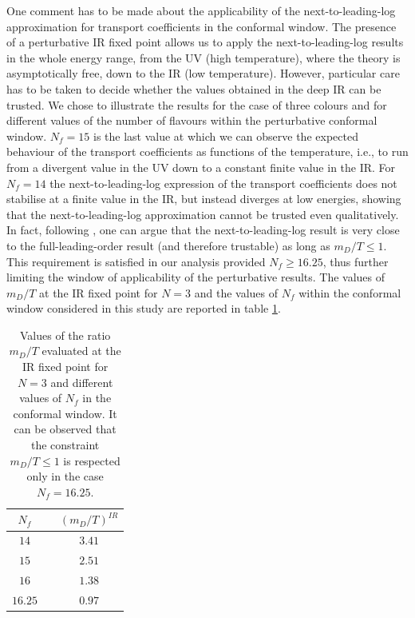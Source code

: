 One comment has to be made about the applicability of the next-to-leading-log approximation for transport coefficients in the conformal window. The presence of a perturbative IR fixed point allows us to apply the next-to-leading-log results in the whole energy range, from the UV (high temperature), where the theory is asymptotically free, down to the IR (low temperature). However, particular care has to be taken to decide whether the values obtained in the deep IR can be trusted. We chose to illustrate the results for the case of three colours and for different values of the number of flavours within the perturbative conformal window. $N_f=15$ is the last value at which we can observe the expected behaviour of the transport coefficients as functions of the temperature, i.e., to run from a divergent value in the UV down to a constant finite value in the IR. For $N_f=14$ the next-to-leading-log expression of the transport coefficients does not stabilise at a finite value in the IR, but instead diverges at low energies, showing that the next-to-leading-log approximation cannot be trusted even qualitatively. In fact, following \cite{Arnold:2003zc}, one can argue that the next-to-leading-log result is very close to the full-leading-order result (and therefore trustable) as long as $m_D/T \leq 1$.  This requirement is satisfied in our analysis provided $N_f \geq 16.25$, thus further limiting the window of applicability of the perturbative results.  The values of $m_D/T$ at the IR fixed point for $N=3$ and the values of $N_f$ within the conformal window considered in this study are reported in table \ref{mDTconstraint}.



   \begin{table}
\begin{center}
        \begin{tabular}{c||c }
    $N_f$ & $ \quad (m_D/T)^{IR}$ \\
    \hline \hline
        $14$ &$\quad 3.41$   \\
        $15$ & $\quad 2.51$ \\
        $16$ & $\quad 1.38$  \\
    $16.25$ & $\quad 0.97$ \\
    \end{tabular}
     \end{center}
\caption{Values of the ratio $m_D/T$ evaluated at the IR fixed point for $N=3$ and different values of $N_f$ in the 
conformal window. It can be observed that the constraint $m_D/T \leq 1$ is respected only in the case $N_f=16.25$.}
\label{mDTconstraint}
    \end{table}


